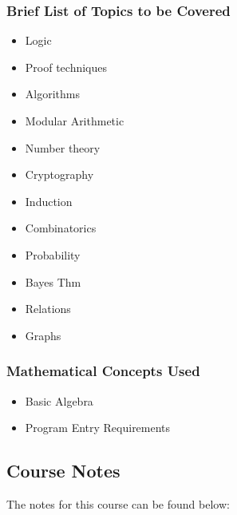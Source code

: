 {\begin{highlight}[\CSPBDisc]
        \subsubsection*{Brief List of Topics to be Covered}
    
        \begin{itemize}
            \item Logic
            \item Proof techniques
            \item Algorithms
            \item Modular Arithmetic
            \item Number theory
            \item Cryptography
            \item Induction
            \item Combinatorics
            \item Probability
            \item Bayes Thm
            \item Relations
            \item Graphs
        \end{itemize}
    
        \subsubsection*{Mathematical Concepts Used}
    
        \begin{itemize}
            \item Basic Algebra
            \item Program Entry Requirements
        \end{itemize}
    \end{highlight}
}

\subsection{Course Notes}

The notes for this course can be found below: 